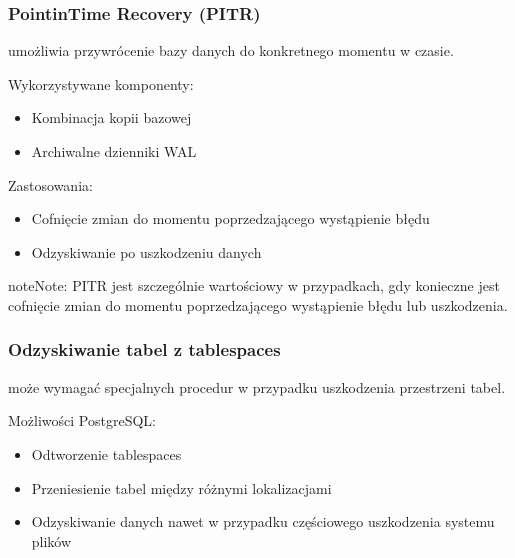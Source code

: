 \documentclass[a4paper,11pt,openany,english]{sphinxmanual}
\begin{document}
\subsubsection{Point\sphinxhyphen{}in\sphinxhyphen{}Time Recovery (PITR)}
\label{\detokenize{rozdzial2/Kopie_zapasowe_i_odzyskiwanie_danych/kopie_zapasowe_i_odzyskiwanie_danych:point-in-time-recovery-pitr}}
\sphinxAtStartPar
{} umożliwia przywrócenie bazy danych do konkretnego momentu w czasie.

\sphinxAtStartPar
Wykorzystywane komponenty:
\begin{itemize}
\item {} 
\sphinxAtStartPar
Kombinacja kopii bazowej

\item {} 
\sphinxAtStartPar
Archiwalne dzienniki WAL

\end{itemize}

\sphinxAtStartPar
Zastosowania:
\begin{itemize}
\item {} 
\sphinxAtStartPar
Cofnięcie zmian do momentu poprzedzającego wystąpienie błędu

\item {} 
\sphinxAtStartPar
Odzyskiwanie po uszkodzeniu danych

\end{itemize}

\begin{sphinxadmonition}{note}{Note:}
\sphinxAtStartPar
PITR jest szczególnie wartościowy w przypadkach, gdy konieczne jest cofnięcie zmian do momentu poprzedzającego wystąpienie błędu lub uszkodzenia.
\end{sphinxadmonition}


\subsubsection{Odzyskiwanie tabel z tablespaces}
\label{\detokenize{rozdzial2/Kopie_zapasowe_i_odzyskiwanie_danych/kopie_zapasowe_i_odzyskiwanie_danych:odzyskiwanie-tabel-z-tablespaces}}
\sphinxAtStartPar
{} może wymagać specjalnych procedur w przypadku uszkodzenia przestrzeni tabel.

\sphinxAtStartPar
Możliwości PostgreSQL:
\begin{itemize}
\item {} 
\sphinxAtStartPar
Odtworzenie tablespaces

\item {} 
\sphinxAtStartPar
Przeniesienie tabel między różnymi lokalizacjami

\item {} 
\sphinxAtStartPar
Odzyskiwanie danych nawet w przypadku częściowego uszkodzenia systemu plików

\end{itemize}
\end{document}

